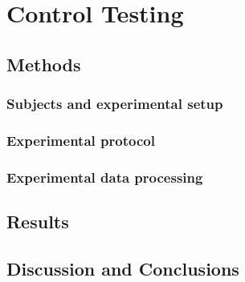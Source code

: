 \chapter{Control Testing}
\label{ch:Control Testing}

\section{Methods}

\subsection{Subjects and experimental setup}

\subsection{Experimental protocol}

\subsection{Experimental data processing}

\section{Results}

\section{Discussion and Conclusions}